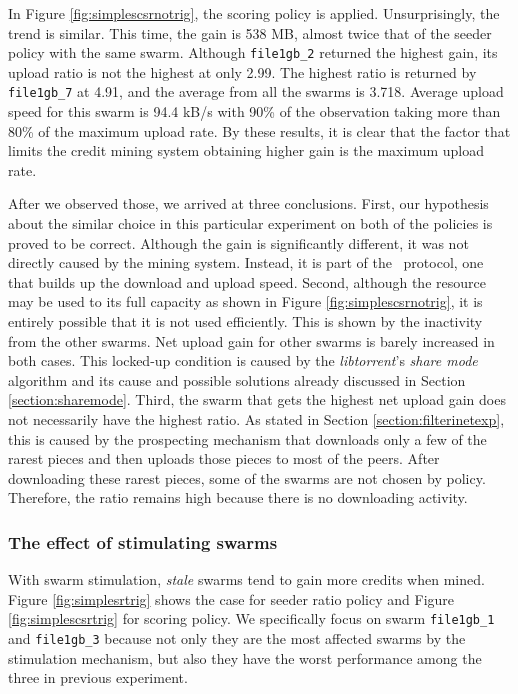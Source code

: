 In Figure \ref{fig:simplescsrnotrig}, the scoring policy is applied. Unsurprisingly, the trend is similar. This time, the gain is 538 MB, almost twice that of the seeder policy with the same swarm.  Although \texttt{file1gb\_2} returned the highest gain, its upload ratio is not the highest at only 2.99.  The highest ratio is returned by \texttt{file1gb\_7} at 4.91, and the average from all the swarms is 3.718. Average upload speed for this swarm is 94.4 kB/s with 90\% of the observation taking more than 80\% of the maximum upload rate. By these results, it is clear that the factor that limits the credit mining system obtaining higher gain is the maximum upload rate. 

After we observed those, we arrived at three conclusions. First, our hypothesis about the similar choice in this particular experiment on both of the policies is proved to be correct. Although the gain is significantly different, it was not directly caused by the mining system. Instead, it is part of the \bt~protocol, one that builds up the download and upload speed. Second, although the resource may be used to its full capacity as shown in Figure \ref{fig:simplescsrnotrig}, it is entirely possible that it is not used efficiently. This is shown by the inactivity from the other swarms. Net upload gain for other swarms is barely increased in both cases. This locked-up condition is caused by the \textit{libtorrent}'s \textit{share mode} algorithm and its cause and possible solutions already discussed in Section \ref{section:sharemode}. Third, the swarm that gets the highest net upload gain does not necessarily have the highest ratio. As stated in Section \ref{section:filterinetexp}, this is caused by the prospecting mechanism that downloads only a few of the rarest pieces and then uploads those pieces to most of the peers. After downloading these rarest pieces, some of the swarms are not chosen by policy. Therefore, the ratio remains high because there is no downloading activity. 

\subsubsection{The effect of stimulating swarms}
With swarm stimulation, \textit{stale} swarms tend to gain more credits when mined. Figure \ref{fig:simplesrtrig} shows the case for seeder ratio policy and Figure \ref{fig:simplescsrtrig} for scoring policy. We specifically focus on swarm \texttt{file1gb\_1} and \texttt{file1gb\_3} because not only they are the most affected swarms by the stimulation mechanism, but also they have the worst performance among the three in previous experiment. 

